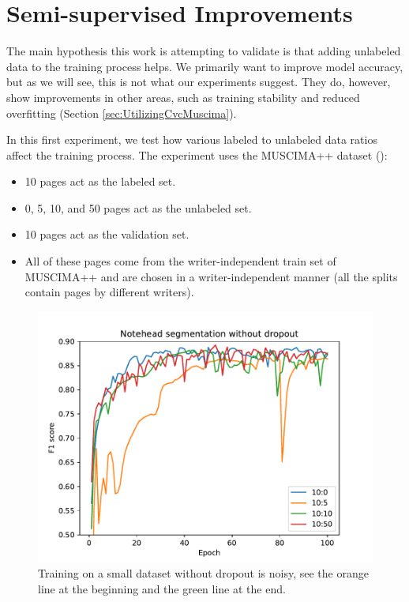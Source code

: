 \section{Semi-supervised Improvements}
\label{sec:SemisupervisedImprovements}

The main hypothesis this work is attempting to validate is that adding unlabeled data to the training process helps. We primarily want to improve model accuracy, but as we will see, this is not what our experiments suggest. They do, however, show improvements in other areas, such as training stability and reduced overfitting (Section \ref{sec:UtilizingCvcMuscima}).

In this first experiment, we test how various labeled to unlabeled data ratios affect the training process. The experiment uses the MUSCIMA++ dataset (\cite{MuscimaPP}):

\begin{itemize}
    \item 10 pages act as the labeled set.
    \item 0, 5, 10, and 50 pages act as the unlabeled set.
    \item 10 pages act as the validation set.
    \item All of these pages come from the writer-independent train set of MUSCIMA++ and are chosen in a writer-independent manner (all the splits contain pages by different writers).
\end{itemize}

\begin{figure}[ht]
    \centering
    \includegraphics[width=140mm]{../../figures/01-exploration-noteheads/noteheads.pdf}
    \caption{Training on a small dataset without dropout is noisy, see the orange line at the beginning and the green line at the end.}
    \label{fig:ExplorationNoteheadsNoDropout}
\end{figure}

